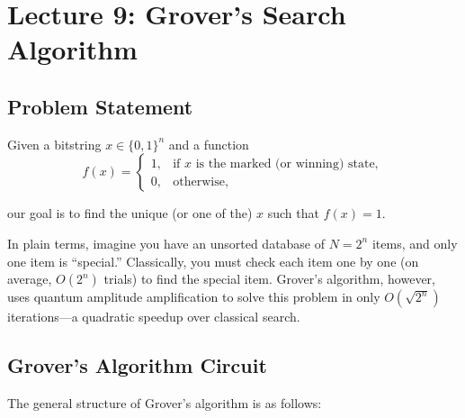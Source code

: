 \section{Lecture 9: Grover's Search Algorithm}\label{sec:lecture9}

\subsection*{Problem Statement}

Given a bitstring \( x \in \{0, 1\}^n \) and a function
\[
  f(x) =
  \begin{cases}
    1, & \text{if } x \text{ is the marked (or winning) state}, \\
    0, & \text{otherwise},
  \end{cases}
\]

our goal is to find the unique (or one of the) \( x \) such that \( f(x)=1 \).

\vspace{0.3cm}

In plain terms, imagine you have an unsorted database of \( N = 2^n \) items,
and only one item is “special.” Classically, you must check each item one by
one (on average, \( O(2^n) \) trials) to find the special item. Grover's
algorithm, however, uses quantum amplitude amplification to solve this
problem in only \( O(\sqrt{2^n}) \) iterations—a quadratic speedup over
classical search.


\subsection*{Grover's Algorithm Circuit}

The general structure of Grover's algorithm is as follows:

